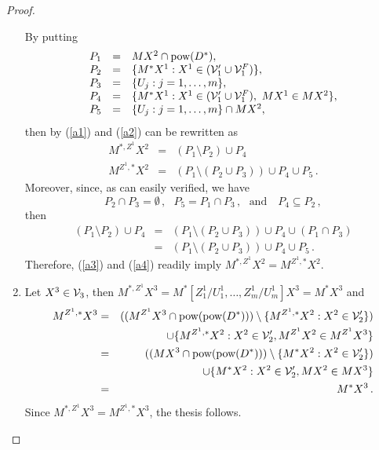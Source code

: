 \documentclass{fundam}
\newcommand{\pow}{\mbox{\rm pow}}
\begin{document}
\begin{proof}
\begin{enumerate}
    By putting
    \[
    \begin{array}{lll}
        P_{1} & = & MX^2 \cap \pow(D^{*}) ,  \\
        P_{2} & = & \{M^{*}X^1: X^1 \in ({\cal V}'_{1}\cup {\cal V}_{1}^{F})\} , \\
        P_{3} & = & \{U_{j}: j = 1,\ldots,m \},  \\
        P_{4} & = & \{M^{*}X^1: X^1 \in ({\cal V}'_{1}\cup {\cal V}_{1}^{F}),~MX^1 \in MX^2\},  \\
        P_{5} & = & \{U_{j}: j = 1,\ldots,m\} \cap MX^2,
    \end{array}
    \]
    then by (\ref{a1}) and (\ref{a2}) can be rewritten as
    \begin{eqnarray}
        M^{*,Z^1}X^2 & = & (P_{1} \setminus P_{2}) \cup P_4 \label{a3}\\
        M^{Z^1,*}X^2 & = & (P_{1} \setminus (P_{2} \cup P_3))
                       \cup P_4 \cup P_5\,.\label{a4}
    \end{eqnarray}
    Moreover, since, as can easily verified, we have
    \[
        P_{2} \cap P_{3}  =  \emptyset\,,~~~
        P_{5}  =  P_{1} \cap P_{3}\,,~~~ \text{and~~~}
        P_{4} \subseteq  P_{2}\,,
    \]
    then
    \begin{eqnarray*}
   (P_{1} \setminus P_{2}) \cup P_4 &=&
    (P_{1} \setminus (P_{2} \cup P_3))
     \cup P_4 \cup (P_{1} \cap P_{3}) \\
    &=&  (P_{1} \setminus (P_{2} \cup P_3))
     \cup P_4 \cup P_5\,.
     \end{eqnarray*}
    Therefore, (\ref{a3}) and (\ref{a4}) readily imply $M^{*,Z^1}X^2 = M^{Z^1,*}X^2$.
\item
    Let $X^3 \in {\cal V}_{3}$, then $M^{*,Z^1} X^3 = M^*[Z_1^1/U_1^1,\ldots,Z_m^1/U_m^1]X^3 = M^* X^3$ and
    \begin{eqnarray*}
        M^{Z^1,*} X^3 & = & ((M^{Z^1} X^3 \cap \pow(\pow(D^*))) \setminus \{M^{Z^1,*}X^2 : X^2 \in {\cal V}'_{2}\})\\
                 &   &  \qquad\cup \{M^{Z^1,*}X^2 : X^2 \in {\cal V}'_{2}, M^{Z^1}X^2 \in M^{Z^1}X^3\} \\
                 & = & ((MX^3 \cap \pow(\pow(D^*))) \setminus \{M^{*}X^2 : X^2 \in {\cal V}'_{2}\}) \\
                 &   &  \qquad\cup \{M^{*}X^2 : X^2 \in {\cal V}'_{2}, MX^2 \in MX^3\}\\
                 & = & M^{*}X^3 \,.
    \end{eqnarray*}
    Since $M^{*,Z^1}X^3 = M^{Z^1,*}X^3$, the thesis follows.
\end{enumerate}
\end{proof}
\end{document}
